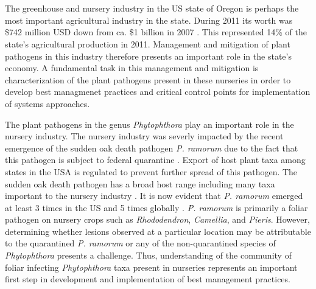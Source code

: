 \documentclass[12pt]{article}
\begin{document}

\noindent\makebox[\linewidth]{\rule{\textwidth}{1pt}} 




\section*{} %

\linenumbers

The greenhouse and nursery industry in the US state of Oregon is perhaps the most important agricultural industry in the state.  During 2011 its worth was \$742 million USD down from ca. \$1 billion in 2007 \cite{oda_2012}.  This represented 14\% of the state's agricultural production in 2011.  Management and mitigation of plant pathogens in this industry therefore presents an important role in the state's economy.  A fundamental task in this management and mitigation is characterization of the plant pathogens present in these nurseries in order to develop best managmenet practices and critical control points for implementation of systems approaches\cite{parke_grunwald_2012}.

The plant pathogens in the genus \emph{Phytophthora} play an important role in the nursery industry. The nursery industry was severly impacted by the recent emergence of the sudden oak death pathogen \emph{P. ramorum} due to the fact that this pathogen is subject to federal quarantine \cite{werres_etal_2001,grunwald_etal_2008}.  Export of host plant taxa among states in the USA is regulated to prevent further spread of this pathogen.  The sudden oak death pathogen has a broad host range including many taxa important to the nursery industry \cite{tooley_etal_2004, hansen_etal_2005}.  It is now evident that \emph{P. ramorum} emerged at least 3 times in the US and 5 times globally \cite{grunwald_etal_2012,van_poucke_etal_2012}. \emph{P. ramorum} is primarily a foliar pathogen on nursery crops such as \emph{Rhododendron}, \emph{Camellia}, and \emph{Pieris}. However, determining whether lesions observed at a particular location may be attributable to the quarantined \emph{P. ramorum} or any of the non-quarantined species of \emph{Phytophthora} presents a challenge.  Thus, understanding of the community of foliar infecting \emph{Phytophthora} taxa present in nurseries represents an important first step in development and implementation of best management practices.
\end{document}
